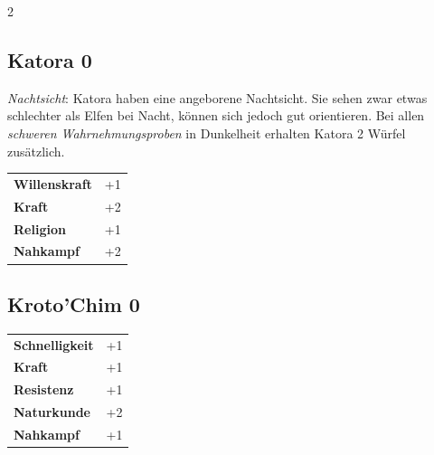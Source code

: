\begin{multicols}{2}
\begin{tcolorbox}

\end{tcolorbox}

\begin{tcolorbox}
    \subsection*{Katora \hfill \small{0 }}
    \tcblower
\textit{Nachtsicht}: Katora haben eine angeborene Nachtsicht. Sie sehen zwar etwas schlechter als Elfen bei Nacht, können sich jedoch gut orientieren. Bei allen \textit{schweren Wahrnehmungsproben} in Dunkelheit erhalten Katora 2 Würfel zusätzlich.


\vspace{3mm}

\begin{tabular}{@{}ll@{}}
    \textbf{Willenskraft} & +1\\
    \textbf{Kraft} & +2\\
    \textbf{Religion} & +1\\
    \textbf{Nahkampf} & +2\\
\end{tabular}


\end{tcolorbox}

\begin{tcolorbox}
    \subsection*{Kroto'Chim \hfill \small{0 }}
    \tcblower




\begin{tabular}{@{}ll@{}}
    \textbf{Schnelligkeit} & +1\\
    \textbf{Kraft} & +1\\
    \textbf{Resistenz} & +1\\
    \textbf{Naturkunde} & +2\\
    \textbf{Nahkampf} & +1\\
\end{tabular}



\end{tcolorbox}
\end{multicols}
